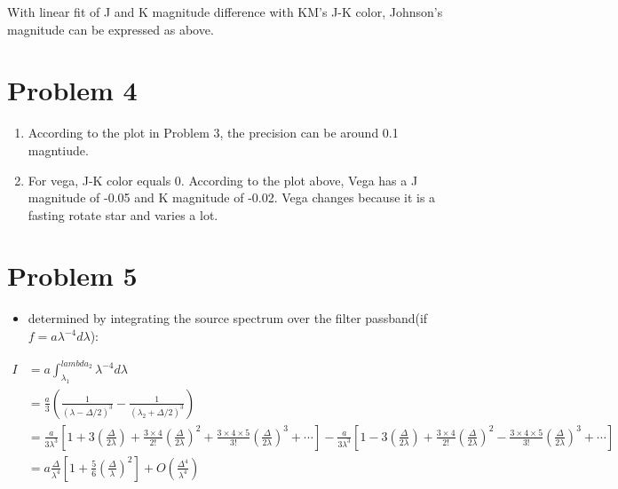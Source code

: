 \documentclass{article}
\begin{document}
    With linear fit of J and K magnitude difference with KM's J-K color,
Johnson's magnitude can be expressed as above.

    \section{Problem 4}\label{problem-4}

\begin{enumerate}
\def\labelenumi{\alph{enumi})}
\itemsep1pt\parskip0pt
\item
  According to the plot in Problem 3, the precision can be around 0.1
  magntiude.
\item
  For vega, J-K color equals 0. According to the plot above, Vega has a
  J magnitude of -0.05 and K magnitude of -0.02. Vega changes because it
  is a fasting rotate star and varies a lot.
\end{enumerate}

    \section{Problem 5}\label{problem-5}

\begin{itemize}
\itemsep1pt\parskip0pt
\item
  determined by integrating the source spectrum over the filter
  passband(if $f = a\lambda^{-4}d\lambda$):
\end{itemize}

\begin{equation}
\begin{split}
I &= a\int_{\lambda_1}^{lambda_2} \lambda^{-4}d\lambda\\
&=\frac{a}{3}\left(\frac{1}{(\lambda - \Delta/2)^3}-\frac{1}{(\lambda_2+\Delta/2)^3}\right)\\
&=\frac{a}{3\lambda^3}\left[1+3\left(\frac{\Delta}{2\lambda}\right) + \frac{3\times4}{2!}\left(\frac{\Delta}{2\lambda}\right)^2+ \frac{3\times4\times5}{3!}\left(\frac{\Delta}{2\lambda}\right)^3+\cdots\right] - \frac{a}{3\lambda^3}\left[1-3\left(\frac{\Delta}{2\lambda}\right) + \frac{3\times4}{2!}\left(\frac{\Delta}{2\lambda}\right)^2-\frac{3\times4\times5}{3!}\left(\frac{\Delta}{2\lambda}\right)^3+\cdots\right]\\
&=a\frac{\Delta}{\lambda^4}\left[1+\frac{5}{6}\left(\frac{\Delta}{\lambda}\right)^2\right] + O\left(\frac{\Delta^4}{\lambda^4}\right)
\end{split}
\end{equation}
\end{document}
